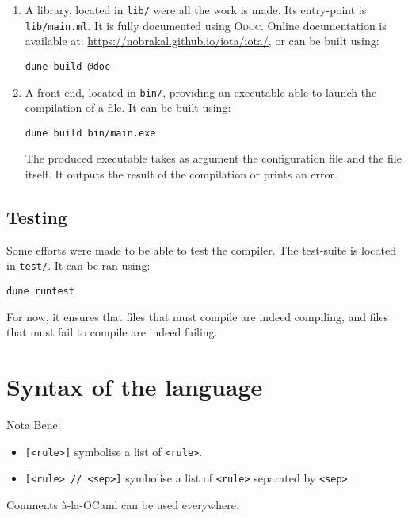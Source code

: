 \documentclass[10pt,a4paper]{article}
\newcommand\Odoc{\textsc{Odoc}}
\begin{document}
\begin{enumerate}
\item A library, located in \verb|lib/| were all the work is made. Its entry-point is \verb|lib/main.ml|. It is fully documented using \Odoc{}\cite{odoc}. Online documentation is available at: \url{https://nobrakal.github.io/iota/iota/}, or can be built using:
\begin{verbatim}
dune build @doc
\end{verbatim}
\item A front-end, located in \verb|bin/|, providing an executable able to launch the compilation of a file. It can be built using:
\begin{verbatim}
dune build bin/main.exe
\end{verbatim}
  The produced executable takes as argument the configuration file and the file itself. It outputs the result of the compilation or prints an error.
\end{enumerate}

\subsection{Testing}
Some efforts were made to be able to test the compiler. The test-suite is located in \verb|test/|. It can be ran using:
\begin{verbatim}
dune runtest
\end{verbatim}
For now, it ensures that files that must compile are indeed compiling, and files that must fail to compile are indeed failing.

\section{Syntax of the language}
Nota Bene:
\begin{itemize}
\item \verb|[<rule>]| symbolise a list of \verb|<rule>|.
\item \verb|[<rule> // <sep>]| symbolise a list of \verb|<rule>| separated by \verb|<sep>|.
\end{itemize}

Comments à-la-OCaml can be used everywhere.
\end{document}

